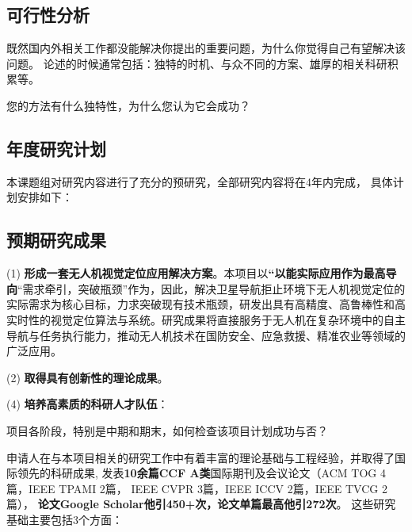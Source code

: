 \documentclass[12pt]{article}
\newcommand{\myEmph}[1]{\textbf{\textcolor[rgb]{0,0,0.25}{#1}}}
\begin{document}
\subsection{可行性分析}

既然国内外相关工作都没能解决你提出的重要问题，为什么你觉得自己有望解决该问题。
论述的时候通常包括：独特的时机、与众不同的方案、雄厚的相关科研积累等。



您的方法有什么独特性，为什么您认为它会成功？


\subsection{年度研究计划}
本课题组对研究内容进行了充分的预研究，全部研究内容将在4年内完成， 具体计划安排如下：

\subsection{预期研究成果}


(1) \myEmph{形成一套无人机视觉定位应用解决方案}。本项目以\myEmph{“以能实际应用作为最高导向}“需求牵引，突破瓶颈”作为，因此，解决卫星导航拒止环境下无人机视觉定位的实际需求为核心目标，力求突破现有技术瓶颈，研发出具有高精度、高鲁棒性和高实时性的视觉定位算法与系统。研究成果将直接服务于无人机在复杂环境中的自主导航与任务执行能力，推动无人机技术在国防安全、应急救援、精准农业等领域的广泛应用。

(2) \myEmph{取得具有创新性的理论成果}。


(4) \myEmph{培养高素质的科研人才队伍}：


项目各阶段，特别是中期和期末，如何检查该项目计划成功与否？




申请人在与本项目相关的研究工作中有着丰富的理论基础与工程经验，并取得了国际领先的科研成果, 
发表\myEmph{10余篇CCF A类}国际期刊及会议论文（ACM TOG 4篇，IEEE TPAMI 2篇，
IEEE CVPR 3篇，IEEE ICCV 2篇，IEEE TVCG 2篇），
\myEmph{论文Google Scholar他引450+次，论文单篇最高他引272次}。
这些研究基础主要包括3个方面：

\end{document}
